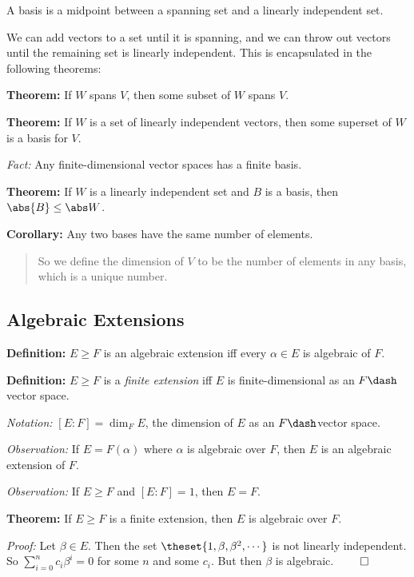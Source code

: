 A basis is a midpoint between a spanning set and a linearly independent
set.

We can add vectors to a set until it is spanning, and we can throw out
vectors until the remaining set is linearly independent. This is
encapsulated in the following theorems:

\textbf{Theorem:} If \(W\) spans \(V\), then some subset of \(W\) spans
\(V\).

\textbf{Theorem:} If \(W\) is a set of linearly independent vectors,
then some superset of \(W\) is a basis for \(V\).

\emph{Fact:} Any finite-dimensional vector spaces has a finite basis.

\textbf{Theorem:} If \(W\) is a linearly independent set and \(B\) is a
basis, then \(\abs{B} \leq \abs W\).

\textbf{Corollary:} Any two bases have the same number of elements.

\begin{quote}
So we define the dimension of \(V\) to be the number of elements in any
basis, which is a unique number.
\end{quote}

\hypertarget{algebraic-extensions}{%
\subsection{Algebraic Extensions}\label{algebraic-extensions}}

\textbf{Definition:} \(E \geq F\) is an algebraic extension iff every
\(\alpha \in E\) is algebraic of \(F\).

\textbf{Definition:} \(E \geq F\) is a \emph{finite extension} iff \(E\)
is finite-dimensional as an \(F\dash\)vector space.

\emph{Notation:} \([E: F] = \dim_F E\), the dimension of \(E\) as an
\(F\dash\)vector space.

\emph{Observation:} If \(E = F(\alpha)\) where \(\alpha\) is algebraic
over \(F\), then \(E\) is an algebraic extension of \(F\).

\emph{Observation:} If \(E\geq F\) and \([E: F] = 1\), then \(E=F\).

\textbf{Theorem:} If \(E \geq F\) is a finite extension, then \(E\) is
algebraic over \(F\).

\emph{Proof:} Let \(\beta \in E\). Then the set
\(\theset{1, \beta, \beta^2, \cdots}\) is not linearly independent. So
\(\sum_{i=0}^n c_i \beta^i = 0\) for some \(n\) and some \(c_i\). But
then \(\beta\) is algebraic. \(\qed\)

